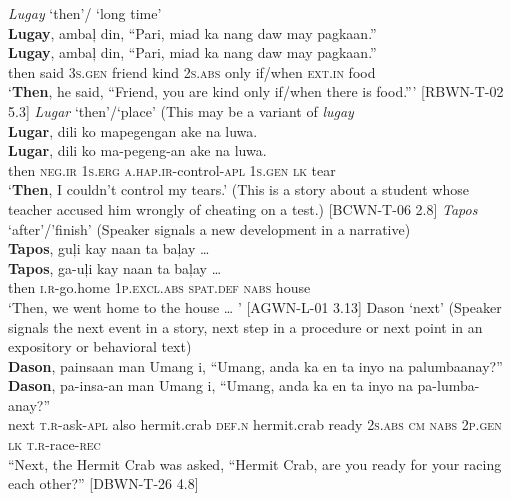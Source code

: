 \newpage
\ea
\textit{Lugay} ‘then’/ ‘long time’\footnotemark \\
\textbf{Lugay},  ambaļ  din,  “Pari,  miad  ka  nang  daw  may  pagkaan.” \\\smallskip
 \gll \textbf{Lugay},  ambaļ  din,  “Pari,  miad  ka  nang  daw  may  pagkaan.”\\
then  said  3\textsc{s.gen}   friend  kind  2\textsc{s.abs}  only  if/when  \textsc{ext.in}  food\\
\glt ‘\textbf{Then}, he said, “Friend, you are kind only if/when there is food.”' [RBWN-T-02 5.3]
\z
\ea
\textit{Lugar} ‘then’/‘place’ (This may be a variant of \textit{lugay} \\
\textbf{Lugar},  dili  ko  mapegengan  ake  na  luwa. \\\smallskip
 \gll \textbf{Lugar},  dili  ko  ma-pegeng-an  ake  na  luwa. \\
then  \textsc{neg.ir}  1\textsc{s.erg}  \textsc{a.}\textsc{hap}\textsc{.ir}-control-\textsc{apl}  1\textsc{s.gen}  \textsc{lk}  tear \\
\glt ‘\textbf{Then}, I couldn’t control my tears.' (This is  a story about a student whose teacher accused him wrongly of cheating on a test.) [BCWN-T-06 2.8]
\z
\ea
\textit{Tapos} ‘after’/’finish’ (Speaker signals a new development in a narrative) \\
\textbf{Tapos},  guļi  kay  naan  ta  baļay … \\\smallskip
 \gll \textbf{Tapos},  ga-uļi  kay  naan  ta  baļay … \\
then  \textsc{i.r}-go.home  1\textsc{p.excl.abs}  \textsc{spat.def} \textsc{nabs}  house \\
\glt ‘Then, we went home to the house … ’ [AGWN-L-01 3.13]
\z
\ea
Dason ‘next’ (Speaker signals the next event in a story, next step in a procedure or next point in an expository or behavioral text) \\
\textbf{Dason},  painsaan  man  Umang  i,  “Umang,  anda  ka  en ta  inyo  na  palumbaanay?” \\\smallskip
 \gll \textbf{Dason},  pa-insa-an  man  Umang  i,  “Umang,  anda  ka  en ta  inyo  na  pa-lumba-anay?” \\
next  \textsc{t.r}-ask-\textsc{apl}  also  hermit.crab  \textsc{def.n}  hermit.crab  ready  2\textsc{s.abs}  \textsc{cm} \textsc{nabs}  2\textsc{p.gen}  \textsc{lk}  \textsc{t.r}-race-\textsc{rec} \\
\glt “Next, the Hermit Crab was asked, “Hermit Crab, are you ready for your racing each  other?” [DBWN-T-26 4.8]
\z
